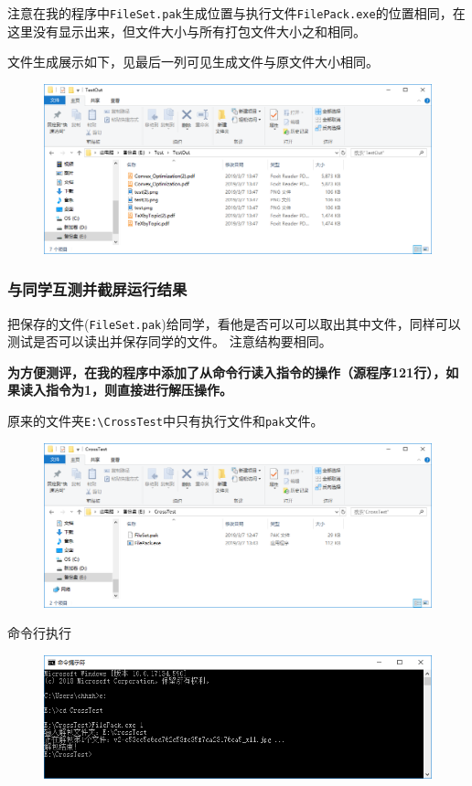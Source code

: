 \documentclass[logo,reportComp]{thesis}
\begin{document}
注意在我的程序中\verb'FileSet.pak'生成位置与执行文件\verb'FilePack.exe'的位置相同，在这里没有显示出来，但文件大小与所有打包文件大小之和相同。

文件生成展示如下，见最后一列可见生成文件与原文件大小相同。
\begin{figure}[H]
\centering
\includegraphics[width=0.8\linewidth]{fig/FilePack-4.PNG}
\end{figure}

\subsubsection{与同学互测并截屏运行结果}
把保存的文件(\verb'FileSet.pak')给同学，看他是否可以可以取出其中文件，同样可以测试是否可以读出并保存同学的文件。
注意结构要相同。

\textbf{为方便测评，在我的程序中添加了从命令行读入指令的操作（源程序121行），如果读入指令为1，则直接进行解压操作。}

原来的文件夹\verb'E:\CrossTest'中只有执行文件和\verb'pak'文件。
\begin{figure}[H]
\centering
\includegraphics[width=0.8\linewidth]{fig/CrossTest-1.PNG}
\end{figure}

命令行执行
\begin{figure}[H]
\centering
\includegraphics[width=0.8\linewidth]{fig/CrossTest-2.PNG}
\end{figure}
\end{document}
